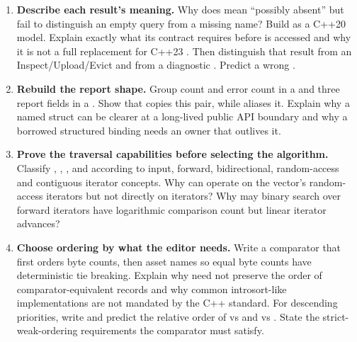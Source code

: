 \begin{enumerate}
\def\labelenumi{\arabic{enumi}.}
\item
  \textbf{Describe each result's meaning.} Why does  mean ``possibly absent'' but fail to distinguish an empty query from a missing name? Build  as a C++20 model. Explain exactly what its  contract requires before  is accessed and why it is not a full replacement for C++23 . Then distinguish that result from an Inspect/Upload/Evict  and from a diagnostic . Predict a wrong .
\item
  \textbf{Rebuild the report shape.} Group count and error count in a  and three report fields in a . Show that  copies this pair, while  aliases it. Explain why a named struct can be clearer at a long-lived public API boundary and why a borrowed structured binding needs an owner that outlives it.
\item
  \textbf{Prove the traversal capabilities before selecting the algorithm.} Classify , , ,  and  according to input, forward, bidirectional, random-access and contiguous iterator concepts. Why can  operate on the vector's random-access iterators but not directly on  iterators? Why may binary search over forward iterators have logarithmic comparison count but linear iterator advances?
\item
  \textbf{Choose ordering by what the editor needs.} Write a comparator that first orders byte counts, then asset names so equal byte counts have deterministic tie breaking. Explain why  need not preserve the order of comparator-equivalent records and why common introsort-like implementations are not mandated by the C++ standard. For descending priorities, write  and predict the relative order of  vs  and  vs . State the strict-weak-ordering requirements the comparator must satisfy.

\end{enumerate}
